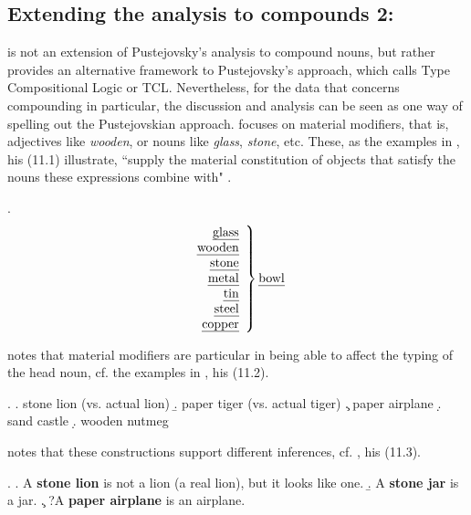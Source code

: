 \subsection{Extending the analysis to compounds 2: \citet{Asher:2011}}
\label{sec:asher}

\citet{Asher:2011} is not an extension of Pustejovsky's analysis to
compound nouns, but rather provides an alternative framework to
Pustejovsky's approach, which \citeauthor{Asher:2011} calls Type Compositional Logic or TCL. Nevertheless, for the data that concerns
compounding in particular, the discussion and analysis can be seen as
one way of spelling out the Pustejovskian approach. 
\citet[301--305]{Asher:2011} focuses on material modifiers, that is,
adjectives like \emph{wooden}, or nouns like \emph{glass},
\emph{stone}, etc. 
These, as the examples in \Next, his (11.1) illustrate, ``supply the
material constitution of objects that satisfy the nouns these
expressions combine with" \citep[301]{Asher:2011}. 

\ex.
\[ \left.
\begin{array}{r}
\text{\emph{glass}}\\\text{\emph{wooden}}\\\text{\emph{stone}}\\\text{\emph{metal}}\\\text{\emph{tin}}\\\text{\emph{steel}}\\\text{\emph{copper}}
\end{array}\right\}  \text{\emph{bowl}}\]

\citet[302]{Asher:2011} notes that material modifiers are particular
in being able to affect the typing of the head noun, cf. the examples in \Next,
his (11.2). %

\ex. \label{ex:asher_2011_p301_ex11.2}
\a. stone lion (vs. actual lion)
\b. paper tiger (vs. actual tiger)
\c. paper airplane
\d. sand castle
\d. wooden nutmeg

\citet[301]{Asher:2011} notes that these constructions support
different inferences, cf. \Next, his (11.3).

\ex. \label{ex:asher_2011_p302_ex11.3}
\a. A \textbf{stone lion} is not a lion (a real lion), but it looks like one.
\b. A \textbf{stone jar} is a jar. \label{ex:asher_2011_p302_ex11.3b}
\c. ?A \textbf{paper airplane} is an airplane. \label{ex:asher_2011_p302_ex11.3c}

